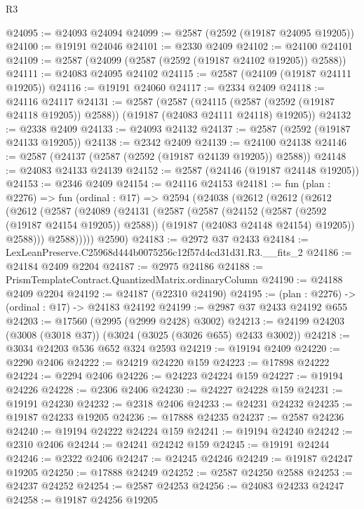 \begin{lexlean}{R3}
\begin{coremodule}
@24095 := @24093 @24094
@24099 := @2587 (@2592 (@19187 @24095 @19205))
@24100 := @19191 @24046
@24101 := @2330 @2409
@24102 := @24100 @24101
@24109 := @2587 (@24099 (@2587 (@2592 (@19187 @24102 @19205)) @2588))
@24111 := @24083 @24095 @24102
@24115 := @2587 (@24109 (@19187 @24111 @19205))
@24116 := @19191 @24060
@24117 := @2334 @2409
@24118 := @24116 @24117
@24131 := @2587
    (@2587
      (@24115 (@2587 (@2592 (@19187 @24118 @19205)) @2588))
      (@19187 (@24083 @24111 @24118) @19205))
@24132 := @2338 @2409
@24133 := @24093 @24132
@24137 := @2587 (@2592 (@19187 @24133 @19205))
@24138 := @2342 @2409
@24139 := @24100 @24138
@24146 := @2587 (@24137 (@2587 (@2592 (@19187 @24139 @19205)) @2588))
@24148 := @24083 @24133 @24139
@24152 := @2587 (@24146 (@19187 @24148 @19205))
@24153 := @2346 @2409
@24154 := @24116 @24153
@24181 := fun (plan : @2276) =>
  fun (ordinal : @17) =>
  @2594
    (@24038
      (@2612
        (@2612
          (@2612
            (@2612
              (@2587
                (@24089
                  (@24131
                    (@2587
                      (@2587
                        (@24152 (@2587 (@2592 (@19187 @24154 @19205)) @2588))
                        (@19187 (@24083 @24148 @24154) @19205))
                      @2588)))
                @2588)))))
      @2590)
@24183 := @2972 @37 @2433
@24184 := LexLeanPreserve.C25968d444b0075256c12f57d4cd31d31.R3.__fits_2
@24186 := @24184 @2409 @2204
@24187 := @2975 @24186
@24188 := PrismTemplateContract.QuantizedMatrix.ordinaryColumn
@24190 := @24188 @2409 @2204
@24192 := @24187 (@22310 @24190)
@24195 := (plan : @2276) -> (ordinal : @17) -> @24183 @24192
@24199 := @2987 @37 @2433 @24192 @655
@24203 := @17560 (@2995 (@2999 @2428) @3002)
@24213 := @24199 @24203 (@3008 (@3018 @37)) (@3024 (@3025 (@3026 @655) @2433 @3002))
@24218 := @3034 @24203 @536 @652 @324 @2593
@24219 := @19194 @2409
@24220 := @2290 @2406
@24222 := @24219 @24220 @159
@24223 := @17898 @24222
@24224 := @2294 @2406
@24226 := @24223 @24224 @159
@24227 := @19194 @24226
@24228 := @2306 @2406
@24230 := @24227 @24228 @159
@24231 := @19191 @24230
@24232 := @2318 @2406
@24233 := @24231 @24232
@24235 := @19187 @24233 @19205
@24236 := @17888 @24235
@24237 := @2587 @24236
@24240 := @19194 @24222 @24224 @159
@24241 := @19194 @24240
@24242 := @2310 @2406
@24244 := @24241 @24242 @159
@24245 := @19191 @24244
@24246 := @2322 @2406
@24247 := @24245 @24246
@24249 := @19187 @24247 @19205
@24250 := @17888 @24249
@24252 := @2587 @24250 @2588
@24253 := @24237 @24252
@24254 := @2587 @24253
@24256 := @24083 @24233 @24247
@24258 := @19187 @24256 @19205

\end{coremodule}
\end{lexlean}
